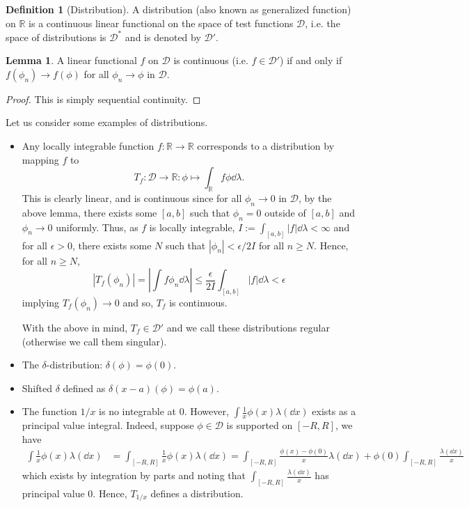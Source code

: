 \documentclass[]{article}
\theoremstyle{definition}
\theoremstyle{definition}
\newtheorem{definition}{Definition}[section]
\newtheorem{lemma}{Lemma}[section]
\begin{document}
\begin{definition}[Distribution]
  A distribution (also known as generalized function) on \(\mathbb{R}\) is a 
  continuous linear functional on the space of test functions \(\mathcal{D}\),
  i.e. the space of distributions is \(\mathcal{D}^*\) and is denoted by 
  \(\mathcal{D}'\). 
\end{definition}

\begin{lemma}
  A linear functional \(f\) on \(\mathcal{D}\) is continuous 
  (i.e. \(f \in \mathcal{D}'\)) if and only if \(f(\phi_n) \to f(\phi)\) 
  for all \(\phi_n \to \phi\) in \(\mathcal{D}\). 
\end{lemma}
\begin{proof}
  This is simply sequential continuity.
\end{proof}

Let us consider some examples of distributions. 
\begin{itemize}
  \item Any locally integrable function \(f : \mathbb{R} \to \mathbb{R}\) 
    corresponds to a distribution by mapping \(f\) to 
    \[T_f : \mathcal{D} \to \mathbb{R} : \phi \mapsto \int_{\mathbb{R}} f\phi \dd \lambda.\]
    This is clearly linear, and is continuous since for all \(\phi_n \to 0\) in 
    \(\mathcal{D}\), by the above lemma, there exists some \([a, b]\) such that 
    \(\phi_n = 0\) outside of \([a, b]\) and \(\phi_n \to 0\) uniformly. 
    Thus, as \(f\) is locally integrable, \(I := \int_{[a, b]} |f| \dd \lambda < \infty\) 
    and for all \(\epsilon > 0\), there exists some \(N\) such that \(|\phi_n| < \epsilon / 2I\) 
    for all \(n \ge N\). Hence, for all \(n \ge N\),
    \[|T_f(\phi_n)| = \left|\int f \phi_n \dd \lambda \right|
      \le \frac{\epsilon}{2I}\int_{[a, b]} |f|\dd \lambda < \epsilon\]
    implying \(T_f(\phi_n) \to 0\) and so, \(T_f\) is continuous.

    With the above in mind, \(T_f \in \mathcal{D}'\) and we call these distributions 
    regular (otherwise we call them singular).  
  \item The \(\delta\)-distribution: \(\delta(\phi) = \phi(0)\).
  \item Shifted \(\delta\) defined as \(\delta(x - a)(\phi) = \phi(a)\).
  \item The function \(1 / x\) is no integrable at 0. However, 
  \(\int \frac{1}{x} \phi(x) \lambda(\dd x)\) exists as a principal value integral. 
  Indeed, suppose \(\phi \in \mathcal{D}\) is supported on \([-R, R]\), we have 
  \[\begin{split}
    \int \frac{1}{x}\phi(x) \lambda(\dd x) & = \int_{[-R, R]} \frac{1}{x} \phi(x) \lambda(\dd x) 
      = \int_{[-R, R]} \frac{\phi(x) - \phi(0)}{x} \lambda(\dd x) + 
        \phi(0) \int_{[-R, R]} \frac{\lambda(\dd x)}{x}
  \end{split}\]
  which exists by integration by parts and noting that 
  \(\int_{[-R, R]} \frac{\lambda(\dd x)}{x}\) has principal value 0. Hence, 
  \(T_{1 / x}\) defines a distribution.
\end{itemize}
\end{document}
